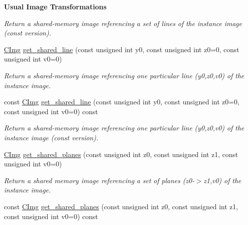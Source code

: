 \begin{Indent}{\bf Usual Image Transformations}
\begin{DoxyCompactItemize}
\begin{DoxyCompactList}\small\item\em Return a shared-\/memory image referencing a set of lines of the instance image (const version). \item\end{DoxyCompactList}\item 
\hypertarget{structcimg__library_1_1_c_img_a6190f2f8a7f0c1f493dc70fcbab755d9}{
\hyperlink{structcimg__library_1_1_c_img}{CImg} \hyperlink{structcimg__library_1_1_c_img_a6190f2f8a7f0c1f493dc70fcbab755d9}{get\_\-shared\_\-line} (const unsigned int y0, const unsigned int z0=0, const unsigned int v0=0)}
\label{structcimg__library_1_1_c_img_a6190f2f8a7f0c1f493dc70fcbab755d9}

\begin{DoxyCompactList}\small\item\em Return a shared-\/memory image referencing one particular line (y0,z0,v0) of the instance image. \item\end{DoxyCompactList}\item 
\hypertarget{structcimg__library_1_1_c_img_a4e94690fd24c71e827a8e51d0a6b7ec1}{
const \hyperlink{structcimg__library_1_1_c_img}{CImg} \hyperlink{structcimg__library_1_1_c_img_a4e94690fd24c71e827a8e51d0a6b7ec1}{get\_\-shared\_\-line} (const unsigned int y0, const unsigned int z0=0, const unsigned int v0=0) const }
\label{structcimg__library_1_1_c_img_a4e94690fd24c71e827a8e51d0a6b7ec1}

\begin{DoxyCompactList}\small\item\em Return a shared-\/memory image referencing one particular line (y0,z0,v0) of the instance image (const version). \item\end{DoxyCompactList}\item 
\hypertarget{structcimg__library_1_1_c_img_a669a67979724edfc2d8c74b3e7134e75}{
\hyperlink{structcimg__library_1_1_c_img}{CImg} \hyperlink{structcimg__library_1_1_c_img_a669a67979724edfc2d8c74b3e7134e75}{get\_\-shared\_\-planes} (const unsigned int z0, const unsigned int z1, const unsigned int v0=0)}
\label{structcimg__library_1_1_c_img_a669a67979724edfc2d8c74b3e7134e75}

\begin{DoxyCompactList}\small\item\em Return a shared memory image referencing a set of planes (z0-\/$>$z1,v0) of the instance image. \item\end{DoxyCompactList}\item 
\hypertarget{structcimg__library_1_1_c_img_a3c3911fd31bc2b2b77085fae5a55cd4c}{
const \hyperlink{structcimg__library_1_1_c_img}{CImg} \hyperlink{structcimg__library_1_1_c_img_a3c3911fd31bc2b2b77085fae5a55cd4c}{get\_\-shared\_\-planes} (const unsigned int z0, const unsigned int z1, const unsigned int v0=0) const }
\label{structcimg__library_1_1_c_img_a3c3911fd31bc2b2b77085fae5a55cd4c}


\end{DoxyCompactItemize}
\end{Indent}
